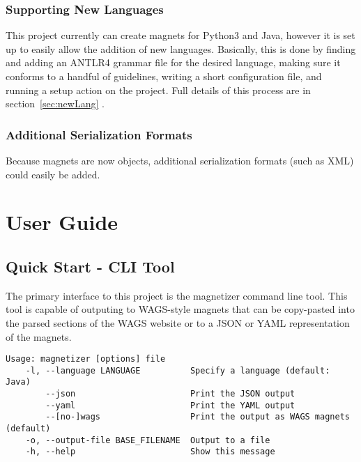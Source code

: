 \documentclass[letter,10pt]{article}
\begin{document}
\subsubsection{Supporting New Languages}

This project currently can create magnets for Python3 and Java, however 
it is set up to easily allow the addition of new languages. 
Basically, this is done by finding and adding an ANTLR4 grammar file 
for the desired language, making sure it conforms to a handful of 
guidelines, writing a short configuration file, and running a setup 
action on the project. Full details of this process are in 
section~\ref{sec:newLang} .


\subsubsection{Additional Serialization Formats}

Because magnets are now objects, additional serialization formats (such 
as XML) could easily be added. 



\section{User Guide}

\subsection{Quick Start - CLI Tool}

The primary interface to this project is the magnetizer command line 
tool. This tool is capable of outputing to WAGS-style magnets that can 
be copy-pasted into the parsed sections of the WAGS website or to a 
JSON or YAML representation of the magnets.

\begin{verbatim}
Usage: magnetizer [options] file
    -l, --language LANGUAGE          Specify a language (default: Java)
        --json                       Print the JSON output
        --yaml                       Print the YAML output
        --[no-]wags                  Print the output as WAGS magnets 
(default)
    -o, --output-file BASE_FILENAME  Output to a file
    -h, --help                       Show this message
\end{verbatim}


\end{document}
